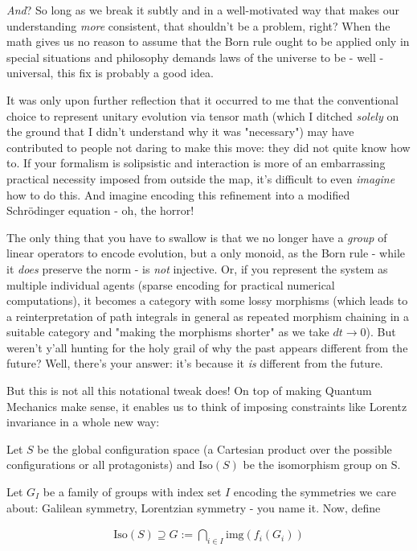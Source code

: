 \documentclass{article}
\begin{document}
\textit{And}? So long as we break it subtly and in a well-motivated way that makes our understanding \textit{more} consistent, that shouldn't be a problem, right? When the math gives us no reason to assume that the Born rule ought to be applied only in special situations and philosophy demands laws of the universe to be - well - universal, this fix is probably a good idea.

It was only upon further reflection that it occurred to me that the conventional choice to represent unitary evolution via tensor math (which I ditched \textit{solely} on the ground that I didn't understand why it was "necessary") may have contributed to people not daring to make this move: they did not quite know how to. If your formalism is solipsistic and interaction is more of an embarrassing practical necessity imposed from outside the map, it's difficult to even \textit{imagine} how to do this. And imagine encoding this refinement into a modified Schrödinger equation - oh, the horror!

The only thing that you have to swallow is that we no longer have a \textit{group} of linear operators to encode evolution, but a only monoid, as the Born rule - while it \textit{does} preserve the norm - is \textit{not} injective. Or, if you represent the system as multiple individual agents (sparse encoding for practical numerical computations), it becomes a category with some lossy morphisms (which leads to a reinterpretation of path integrals in general as repeated morphism chaining in a suitable category and "making the morphisms shorter" as we take $dt\to 0$). But weren't y'all hunting for the holy grail of why the past appears different from the future? Well, there's your answer: it's because it \textit{is} different from the future.

But this is not all this notational tweak does! On top of making Quantum Mechanics make sense, it enables us to think of imposing constraints like Lorentz invariance in a whole new way:

Let $S$ be the global configuration space (a Cartesian product over the possible configurations or all protagonists) and $\mathrm{Iso}(S)$ be the isomorphism group on S.

Let $G_I$ be a family of groups with index set $I$ encoding the symmetries we care about: Galilean symmetry, Lorentzian symmetry - you name it. Now, define

\begin{align*}
\mathrm{Iso}(S) \supseteq G := \bigcap_{i\in I}\mathrm{img}(f_i(G_i))
\end{align*}
\end{document}
